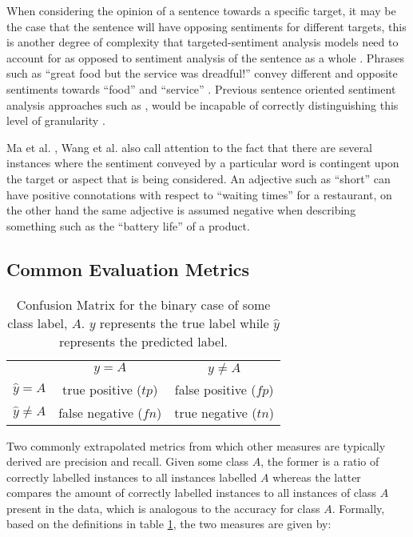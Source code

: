 \documentclass[../../fyp.tex]{subfiles}
\begin{document}
When considering the opinion of a sentence towards a specific target, it may be the case that the sentence will have opposing sentiments for different targets, this is another degree of complexity that targeted-sentiment analysis models need to account for as opposed to sentiment analysis of the sentence as a whole \cite{tang}. Phrases such as \enquote{great food but the service was dreadful!} convey different and opposite sentiments towards \enquote{food} and \enquote{service} \cite{tang2016}. Previous sentence oriented sentiment analysis approaches such as \cite{socher2011}, \cite{appel2016} would be incapable of correctly distinguishing this level of granularity \cite{chen2017}.

Ma et al. \cite{dehongma2017}, Wang et al. \cite{wang2018} also call attention to the fact that there are several instances where the sentiment conveyed by a particular word is contingent upon the target or aspect that is being considered. An adjective such as \enquote{short} can have positive connotations with respect to \enquote{waiting times} for a restaurant, on the other hand the same adjective is assumed negative when describing something such as the \enquote{battery life} of a product.

\subsection{Common Evaluation Metrics}\label{sec:eval_metrics}
\begin{table}[h!]
	\centering
	\begin{tabular}{||l c c||}
		\hline
		                 & $y=A$                 & $y\neq{A}$            \\ [0.5ex]
		$\hat{y}=A$      & true positive ($tp$)  & false positive ($fp$) \\
		$\hat{y}\neq{A}$ & false negative ($fn$) & true negative ($tn$)  \\
		\hline
	\end{tabular}
	\caption{Confusion Matrix for the binary case of some class label, $A$. $y$ represents the true label while $\hat{y}$ represents the predicted label.}
	\label{table:confusion_matrix}
\end{table}

Two commonly extrapolated metrics from which other measures are typically derived are precision and recall. Given some class $A$, the former is a ratio of correctly labelled instances to all instances labelled $A$ whereas the latter compares the amount of correctly labelled instances to all instances of class $A$ present in the data, which is analogous to the accuracy for class $A$. Formally, based on the definitions in table \ref{table:confusion_matrix}, the two measures are given by:
\end{document}
